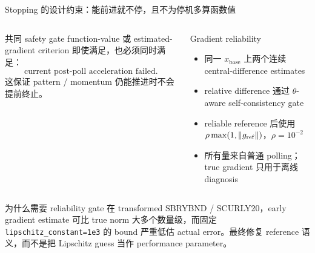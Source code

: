 \documentclass[aspectratio=169,10pt]{beamer}
\newcommand{\tight}{\setlength{\itemsep}{0.35em}\setlength{\parskip}{0pt}}
\begin{document}
\begin{frame}{Stopping 的设计约束：能前进就不停，且不为停机多算函数值}
\small
\begin{columns}[T,onlytextwidth]
\begin{block}{共同 safety gate}
function-value 或 estimated-gradient criterion 即使满足，也必须同时满足：
\[
\text{current post-poll acceleration failed}.
\]
这保证 pattern / momentum 仍能推进时不会提前终止。
\end{block}

\begin{block}{Gradient reliability}
\begin{itemize}\tight
  \item 同一 $x_{\mathrm{base}}$ 上两个连续 central-difference estimates
  \item relative difference 通过 $\theta$-aware self-consistency gate
  \item reliable reference 后使用 $\rho\max(1,\|g_{\rm ref}\|)$，$\rho=10^{-2}$
  \item 所有量来自普通 polling；true gradient 只用于离线 diagnosis
\end{itemize}
\end{block}
\end{columns}

\vspace{0.6em}
\begin{alertblock}{为什么需要 reliability gate}
在 transformed SBRYBND / SCURLY20，early gradient estimate 可比 true norm 大多个数量级，而固定 \texttt{lipschitz\_constant=1e3} 的 bound 严重低估 actual error。最终修复 reference 语义，而不是把 Lipschitz guess 当作 performance parameter。
\end{alertblock}
\end{frame}
\end{document}
